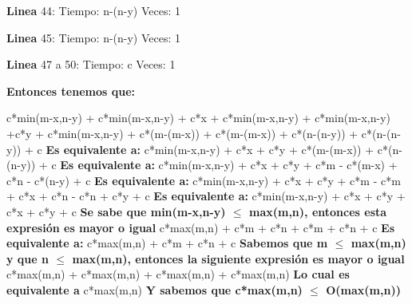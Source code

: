 \documentclass[12pt,a4,paper]{article}
\begin{document}
\textbf{Linea} 44:\newline
Tiempo: n-(n-y) \newline
Veces: 1 \newline

\textbf{Linea} 45:\newline
Tiempo: n-(n-y)\newline
Veces: 1 \newline

\textbf{Linea} 47 a 50:\newline
Tiempo: c \newline
Veces: 1 \newline\newline

\textbf{Entonces tenemos que:}

c*min(m-x,n-y) + c*min(m-x,n-y) + c*x + c*min(m-x,n-y) + c*min(m-x,n-y) +c*y + c*min(m-x,n-y) + c*(m-(m-x)) + c*(m-(m-x)) + c*(n-(n-y)) + c*(n-(n-y)) + c\newline
\textbf{Es equivalente a:}\newline
c*min(m-x,n-y) + c*x + c*y + c*(m-(m-x)) + c*(n-(n-y)) + c\newline
\textbf{Es equivalente a:}\newline
c*min(m-x,n-y) + c*x + c*y + c*m - c*(m-x) + c*n - c*(n-y) + c\newline
\textbf{Es equivalente a:}\newline
c*min(m-x,n-y) + c*x + c*y + c*m - c*m + c*x + c*n - c*n + c*y + c\newline
\textbf{Es equivalente a:}\newline
c*min(m-x,n-y) + c*x + c*y + c*x + c*y + c\newline
\textbf{Se sabe que min(m-x,n-y) $\leq$ max(m,n), entonces esta expresión es mayor o igual}\newline
c*max(m,n) + c*m + c*n + c*m + c*n + c\newline
\textbf{Es equivalente a:}\newline
c*max(m,n) + c*m + c*n + c\newline
\textbf{Sabemos que m $\leq$ max(m,n) y que n $\leq$ max(m,n), entonces la siguiente expresión es mayor o igual}\newline
c*max(m,n) + c*max(m,n) + c*max(m,n) + c*max(m,n)\newline
\textbf{Lo cual es equivalente a }\newline
c*max(m,n) \newline
\textbf{Y sabemos que c*max(m,n) $\leq$ O(max(m,n)) }\newline
\end{document}
